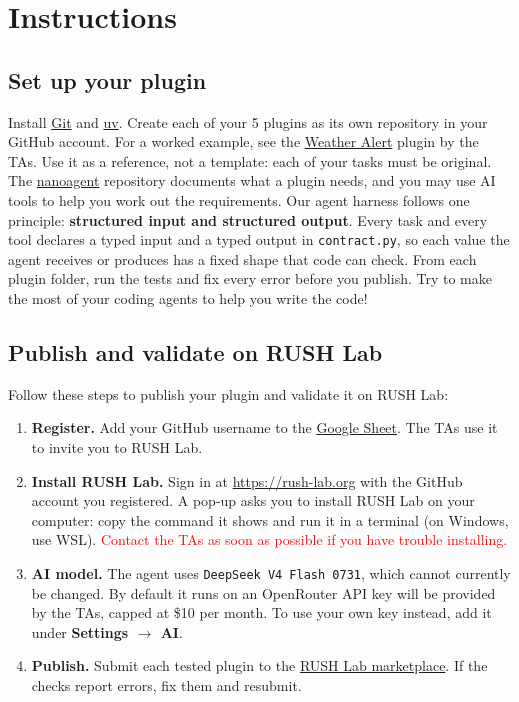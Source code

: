 \documentclass{article}
\begin{document}
\section{Instructions}

\subsection{Set up your plugin}

Install \href{https://git-scm.com/downloads}{Git} and \href{https://docs.astral.sh/uv/getting-started/installation/}{uv}. Create each of your 5 plugins as its own repository in your GitHub account. For a worked example, see the
\href{https://github.com/sahiljoshi515/mochi-weather-alert}
{Weather Alert} plugin by the TAs. Use it as a reference, not a template: each of your tasks must be original. The \href{https://github.com/RUSH-LAB/NanoAgent}{nanoagent} repository documents what a plugin needs, and you may use AI tools to help you work out the requirements.
Our agent harness follows one principle: \textbf{structured input and structured output}. Every task and every tool declares a typed input and a typed output in \texttt{contract.py}, so each value the agent receives or produces has a fixed shape that code can check.
From each plugin folder, run the tests and fix every error before you publish. Try to make the most of your coding agents to help you write the code!

\subsection{Publish and validate on RUSH Lab}

Follow these steps to publish your plugin and validate it on RUSH Lab:

\begin{enumerate}
    \item \textbf{Register.} Add your GitHub username to the \href{https://docs.google.com/spreadsheets/d/1Ma6fnMdo97y_qwLINhce3VevuifKi9qF6H5VCbSyEEg/edit?gid=0#gid=0}{Google Sheet}. The TAs use it to invite you to RUSH Lab.

    \item \textbf{Install RUSH Lab.} Sign in at \url{https://rush-lab.org} with the GitHub account you registered. A pop-up asks you to install RUSH Lab on your computer: copy the command it shows and run it in a terminal (on Windows, use WSL). \textcolor{red}{Contact the TAs as soon as possible if you have trouble installing.}

    \item \textbf{AI model.} The agent uses \texttt{DeepSeek V4 Flash 0731}, which cannot currently be changed. By default it runs on an OpenRouter API key will be provided by the TAs, capped at \$10 per month. To use your own key instead, add it under \textbf{Settings $\rightarrow$ AI}.

    \item \textbf{Publish.} Submit each tested plugin to the \href{https://rush-lab.org/marketplace}{RUSH Lab marketplace}. If the checks report errors, fix them and resubmit.
\end{enumerate}
\end{document}
